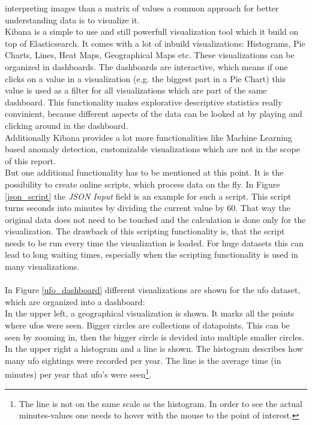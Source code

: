 \documentclass[bibliography=totoc]{article}
\begin{document}
interpreting images than a matrix of values a common approach for better understanding data 
is to visualize it.
\\
Kibana is a simple to use and still powerfull visualization tool which it build on top 
of Elasticsearch. It comes with a lot of inbuild visualizations: Histograms, 
Pie Charts, Lines, Heat Maps, Geographical Maps etc. These visualizations can be organized
in dashboards. The dashboards are interactive, which means if one clicks on 
a value in a visualization (e.g. the biggest part in a Pie Chart) this value is used
as a filter for all visualizations which are part of the same dashboard.
This functionality makes explorative descriptive statistics really convinient, 
because different aspects of the data can be looked at by playing and clicking
around in the dashboard.
\\
Additionally Kibana provides a lot more functionalities like Machine Learning
based anomaly detection, customizable visualizations which are not in the scope of this report.
\\
But one additional functionality has to be mentioned at this point. It is the 
possibility to create online scripts, which process data on the fly. In Figure \ref{json_script} 
the \textit{JSON Input} field is an example for such a script. This script turns seconds
into minutes by dividing the current value by 60. That way the original data does not
need to be touched and the calculation is done only for the visualization. The drawback of this
scripting functionality is, that the script needs to be run every time the visualization is loaded.
For huge datasets this can lead to long waiting times, especially when the scripting 
functionality is used in many visualizations.
\\
\\
In Figure \ref{ufo_dashboard} different visualizations are shown for the ufo dataset,
which are organized into a dashboard:
\\
In the upper left, a geographical visualization is shown. It marks all the points
where ufos were seen. Bigger circles are collections of datapoints. This can be seen
by zooming in, then the bigger circle is devided into multiple smaller circles.
\\
In the upper right a histogram and a line is shown. The histogram describes
how many ufo sightings were recorded per year. The line is the average time 
(in minutes) per year that ufo's were seen\footnote{The line is not on the same scale as the histogram.
In order to see the actual minutes-values one needs to hover with the mouse to the point of interest.}.
\end{document}
